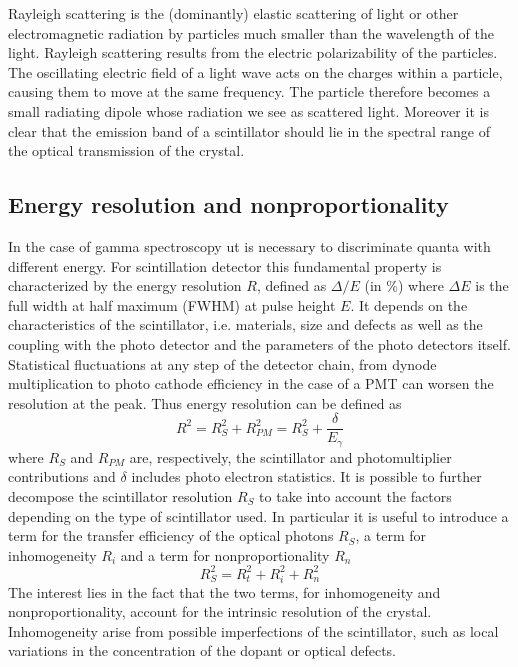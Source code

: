 Rayleigh scattering is the (dominantly) elastic scattering of light or other electromagnetic radiation by particles much smaller than the wavelength of the light. 
Rayleigh scattering results from the electric polarizability of the particles. The oscillating electric field of a light wave acts on the charges within a particle, causing them to move at the same frequency. The particle therefore becomes a small radiating dipole whose radiation we see as scattered light.
Moreover it is clear that the emission band of a scintillator should lie in the spectral range of the optical transmission of the crystal.

\subsection{Energy resolution and nonproportionality}
In the case of gamma spectroscopy ut is necessary to discriminate quanta with different energy.
For scintillation detector this fundamental property is characterized by the energy resolution $R$, defined as $\Delta /E$ (in $\%$) where $\Delta E$ is the full width at half maximum (FWHM) at pulse height $E$.
It depends on the characteristics of the scintillator, i.e. materials, size and defects as well as the coupling with the photo detector and the parameters of the photo detectors itself. Statistical fluctuations at any step of the detector chain, from dynode multiplication to photo cathode efficiency in the case of a PMT can worsen the resolution at the peak. 
Thus energy resolution can be defined as\cite{Rodnyi1997}
\begin{equation}
R^{2} = R_{S}^{2} + R_{PM}^{2} = R_{S}^{2} + \frac{\delta}{E_{\gamma}}
\end{equation}
where $R_{S}$ and $R_{PM}$ are, respectively, the scintillator and photomultiplier contributions and $\delta$ includes photo electron statistics.
It is possible to further decompose the scintillator resolution $R_{S}$ to take into account the factors depending on the type of scintillator used. In particular it is useful to introduce a term for the transfer efficiency of the optical photons $R_{S}$, a term for inhomogeneity $R_{i}$ and a term for nonproportionality $R_{n}$
\begin{equation}
R_{S}^{2} = R_{t}^{2} + R_{i}^{2} + R_{n}^{2}
\end{equation}
The interest lies in the fact that the two terms, for inhomogeneity and nonproportionality, account for the intrinsic resolution of the crystal.
Inhomogeneity arise from possible imperfections of the scintillator, such as local variations in the concentration of the dopant or optical defects.

